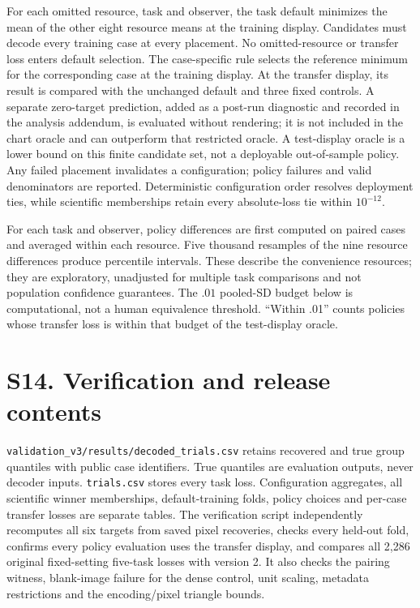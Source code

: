 \documentclass[10pt]{article}
\begin{document}
For each omitted resource, task and observer, the task default minimizes the mean of the other eight resource means at the training display. Candidates must decode every training case at every placement. No omitted-resource or transfer loss enters default selection. The case-specific rule selects the reference minimum for the corresponding case at the training display. At the transfer display, its result is compared with the unchanged default and three fixed controls. A separate zero-target prediction, added as a post-run diagnostic and recorded in the analysis addendum, is evaluated without rendering; it is not included in the chart oracle and can outperform that restricted oracle. A test-display oracle is a lower bound on this finite candidate set, not a deployable out-of-sample policy. Any failed placement invalidates a configuration; policy failures and valid denominators are reported. Deterministic configuration order resolves deployment ties, while scientific memberships retain every absolute-loss tie within $10^{-12}$.

For each task and observer, policy differences are first computed on paired cases and averaged within each resource. Five thousand resamples of the nine resource differences produce percentile intervals. These describe the convenience resources; they are exploratory, unadjusted for multiple task comparisons and not population confidence guarantees. The $.01$ pooled-SD budget below is computational, not a human equivalence threshold. ``Within .01'' counts policies whose transfer loss is within that budget of the test-display oracle.



\section*{S14. Verification and release contents}
\texttt{validation\_v3/results/decoded\_trials.csv} retains recovered and true group quantiles with public case identifiers. True quantiles are evaluation outputs, never decoder inputs. \texttt{trials.csv} stores every task loss. Configuration aggregates, all scientific winner memberships, default-training folds, policy choices and per-case transfer losses are separate tables. The verification script independently recomputes all six targets from saved pixel recoveries, checks every held-out fold, confirms every policy evaluation uses the transfer display, and compares all 2,286 original fixed-setting five-task losses with version 2. It also checks the pairing witness, blank-image failure for the dense control, unit scaling, metadata restrictions and the encoding/pixel triangle bounds.
\end{document}
